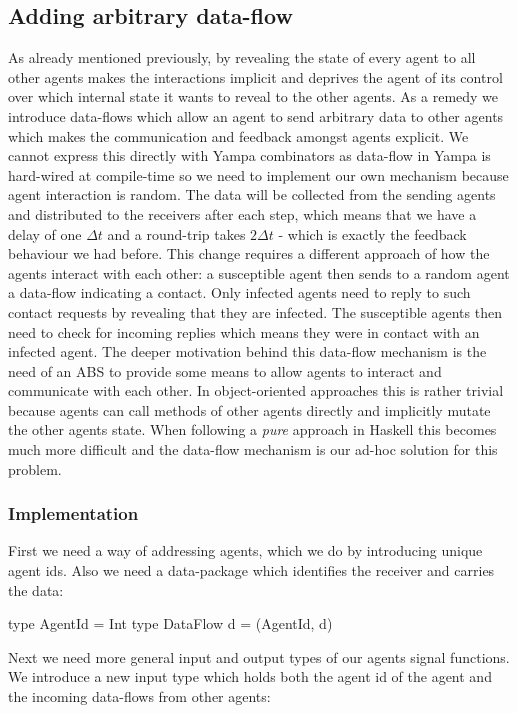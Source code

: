 \subsection{Adding arbitrary data-flow}
\label{sec:step3_dataflow}
As already mentioned previously, by revealing the state of every agent to all other agents makes the interactions implicit and deprives the agent of its control over which internal state it wants to reveal to the other agents. As a remedy we introduce data-flows which allow an agent to send arbitrary data to other agents which makes the communication and feedback amongst agents explicit. We cannot express this directly with Yampa combinators as data-flow in Yampa is hard-wired at compile-time so we need to implement our own mechanism because agent interaction is random. The data will be collected from the sending agents and distributed to the receivers after each step, which means that we have a delay of one $\Delta t$ and a round-trip takes $2 \Delta t$ - which is exactly the feedback behaviour we had before.
This change requires a different approach of how the agents interact with each other: a susceptible agent then sends to a random agent a data-flow indicating a contact. Only infected agents need to reply to such contact requests by revealing that they are infected. The susceptible agents then need to check for incoming replies which means they were in contact with an infected agent.
The deeper motivation behind this data-flow mechanism is the need of an ABS to provide some means to allow agents to interact and communicate with each other. In object-oriented approaches this is rather trivial because agents can call methods of other agents directly and implicitly mutate the other agents state. When following a \textit{pure} approach in Haskell this becomes much more difficult and the data-flow mechanism is our ad-hoc solution for this problem.

\subsubsection{Implementation}
First we need a way of addressing agents, which we do by introducing unique agent ids. Also we need a data-package which identifies the receiver and carries the data:
\begin{HaskellCode}
type AgentId     = Int
type DataFlow d = (AgentId, d)
\end{HaskellCode}

Next we need more general input and output types of our agents signal functions. We introduce a new input type which holds both the agent id of the agent and the incoming data-flows from other agents:

